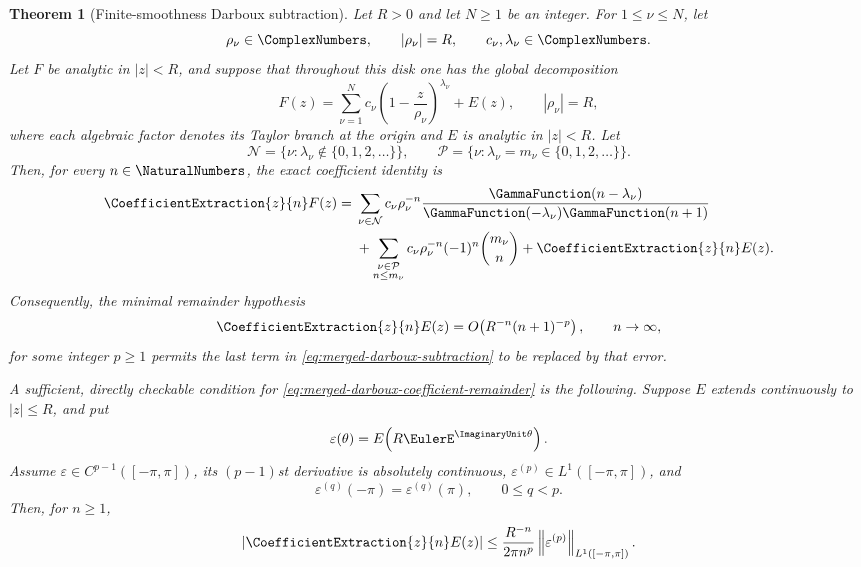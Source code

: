 \documentclass[11pt,a4paper,oneside,openany]{book}
\newtheorem{theorem}{Theorem}[chapter]
\theoremstyle{definition}
\theoremstyle{remark}
\begin{document}
\begin{theorem}[Finite-smoothness Darboux subtraction]
\label{thm:merged-darboux-finite-smoothness}
Let $R>0$ and let $N\geq1$ be an integer.  For $1\leq\nu\leq N$, let
\[
 \rho_\nu\in\ComplexNumbers,\qquad |\rho_\nu|=R,\qquad
 c_\nu,\lambda_\nu\in\ComplexNumbers.
\]
Let $F$ be analytic in $|z|<R$, and suppose that throughout this disk one has
the global decomposition
\begin{equation}
 F(z)=\sum_{\nu=1}^{N}c_\nu
       \left(1-\frac z{\rho_\nu}\right)^{\lambda_\nu}+E(z),
 \qquad |\rho_\nu|=R,                                               \label{eq:merged-darboux-subtraction-decomposition}
\end{equation}
where each algebraic factor denotes its Taylor branch at the origin and $E$ is
analytic in $|z|<R$.  Let
\[
 \mathcal N=\{\nu:\lambda_\nu\notin\{0,1,2,\ldots\}\},\qquad
 \mathcal P=\{\nu:\lambda_\nu=m_\nu\in\{0,1,2,\ldots\}\}.
\]
Then, for every $n\in\NaturalNumbers$, the exact coefficient identity is
\begin{align}
 \CoefficientExtraction{z}{n}F(z)={}&
 \sum_{\nu\in\mathcal N}c_\nu\rho_\nu^{-n}
 \frac{\GammaFunction(n-\lambda_\nu)}
      {\GammaFunction(-\lambda_\nu)\GammaFunction(n+1)}                            \notag\\
 &+\sum_{\substack{\nu\in\mathcal P\\ n\leq m_\nu}}
 c_\nu\rho_\nu^{-n}(-1)^n\binom{m_\nu}{n}
 +\CoefficientExtraction{z}{n}E(z).                                                        \label{eq:merged-darboux-subtraction}
\end{align}
Consequently, the minimal remainder hypothesis
\begin{equation}
 \CoefficientExtraction{z}{n}E(z)=O\!\left(R^{-n}(n+1)^{-p}\right),\qquad n\to\infty,      \label{eq:merged-darboux-coefficient-remainder}
\end{equation}
for some integer $p\geq1$ permits the last term in
\eqref{eq:merged-darboux-subtraction} to be replaced by that error.

A sufficient, directly checkable condition for
\eqref{eq:merged-darboux-coefficient-remainder} is the following.  Suppose $E$
extends continuously to $|z|\leq R$, and put
\[
 \varepsilon(\theta)=E\!\left(R\EulerE^{\ImaginaryUnit\theta}\right).
\]
Assume $\varepsilon\in C^{p-1}([-\pi,\pi])$, its $(p-1)$st derivative is
absolutely continuous, $\varepsilon^{(p)}\in L^1([-\pi,\pi])$, and
\[
 \varepsilon^{(q)}(-\pi)=\varepsilon^{(q)}(\pi),\qquad 0\leq q<p.
\]
Then, for $n\geq1$,
\begin{equation}
 \left|\CoefficientExtraction{z}{n}E(z)\right|
 \leq\frac{R^{-n}}{2\pi n^p}
       \left\|\varepsilon^{(p)}\right\|_{L^1([-\pi,\pi])}.        \label{eq:merged-darboux-boundary-remainder}
\end{equation}
\end{theorem}
\end{document}
